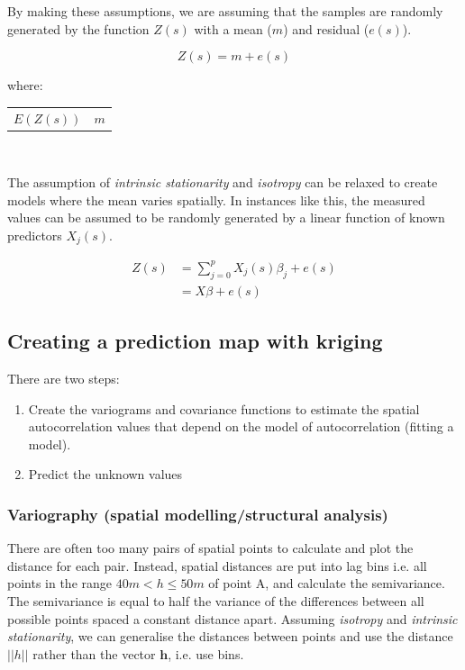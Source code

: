 \documentclass{article}
\makeatletter
\newenvironment{conditions}[1][where:] 
  {#1 \begin{tabular}[t]{>{$}l<{$} @{${}={}$} l}}
  {\end{tabular}\\[\belowdisplayskip]}
\makeatother
\begin{document}
By making these assumptions, we are assuming that the samples are randomly generated by the function $Z(s)$ with a mean ($m$) and residual ($e(s)$).

\[Z(s) = m + e(s)\]

\begin{conditions}
    E\left(Z(s)\right) & $m$
\end{conditions}

The assumption of \textit{intrinsic stationarity} and \textit{isotropy} can be relaxed to create models where the mean varies spatially.
In instances like this, the measured values can be assumed to be randomly generated by a linear function of known predictors $X_j(s)$.

\begin{equation}
    \begin{split}
        Z(s) & = \sum_{j=0}^p X_j(s)\beta_j + e(s) \\
        & = X\beta + e(s)
    \end{split}    
\end{equation}


\subsection{Creating a prediction map with kriging}

There are two steps:

\begin{enumerate}
    \item Create the variograms and covariance functions to estimate the spatial autocorrelation values that depend on the model of autocorrelation (fitting a model).
    \item Predict the unknown values
\end{enumerate}

\subsubsection{Variography (spatial modelling/structural analysis)}

There are often too many pairs of spatial points to calculate and plot the distance for each pair.
Instead, spatial distances are put into lag bins i.e. all points in the range $40m < h \le 50m$ of point A, and calculate the semivariance.
The semivariance is equal to half the variance of the differences between all possible points spaced a constant distance apart.
Assuming \textit{isotropy} and \textit{intrinsic stationarity}, we can generalise the distances between points and use the distance $||h||$ rather than the vector $\textbf{h}$, i.e. use bins.
\end{document}
